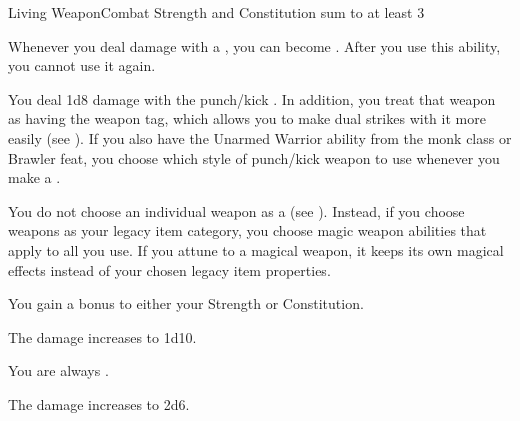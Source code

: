   \begin{feat}{Living Weapon}{Combat}
    \featpre Strength and Constitution sum to at least 3

     Whenever you deal damage with a , you can become  \steeled.
    After you use this ability, you  cannot use it again.

     You deal 1d8 damage with the punch/kick .
    In addition, you treat that weapon as having the  weapon tag, which allows you to make dual strikes with it more easily (see ).
    If you also have the Unarmed Warrior ability from the monk class or Brawler feat, you choose which style of punch/kick weapon to use whenever you make a .

     You do not choose an individual weapon as a  (see ).
    Instead, if you choose weapons as your legacy item category, you choose magic weapon abilities that apply to all  you use.
    If you attune to a magical weapon, it keeps its own magical effects instead of your chosen legacy item properties.

     You gain a  bonus to either your Strength or Constitution.

     The damage increases to 1d10.

     You are always \steeled.

     The damage increases to 2d6.
  \end{feat}

